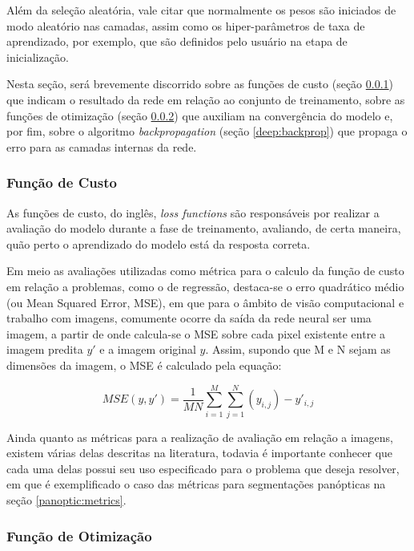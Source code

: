 Além da seleção aleatória, vale citar que normalmente os pesos são iniciados de modo aleatório nas camadas, assim como os hiper-parâmetros de taxa de aprendizado, por exemplo, que são definidos pelo usuário na etapa de inicialização.

Nesta seção, será brevemente discorrido sobre as funções de custo (seção \ref{deep:cust}) que indicam o resultado da rede em relação ao conjunto de treinamento, sobre as funções de otimização (seção \ref{deep:optimization}) que auxiliam na convergência do modelo e, por fim, sobre o algoritmo \textit{backpropagation} (seção \ref{deep:backprop}) que propaga o erro para as camadas internas da rede.


\subsubsection{Função de Custo}
\label{deep:cust}

As funções de custo, do inglês, \textit{loss functions} são responsáveis por realizar a avaliação do modelo durante a fase de treinamento, avaliando, de certa maneira, quão perto o aprendizado do modelo está da resposta correta.

Em meio as avaliações utilizadas como métrica para o calculo da função de custo em relação a problemas, como o de regressão, destaca-se o erro quadrático médio (ou Mean Squared Error, MSE)\cite{Wang2004ImageSimilarity}, em que para o âmbito de visão computacional e trabalho com imagens, comumente ocorre da saída da rede neural ser uma imagem, a partir de onde calcula-se o MSE sobre cada pixel existente entre a imagem predita $y'$ e a imagem original $y$. Assim, supondo que M e N sejam as dimensões da imagem, o MSE é calculado pela equação:

\begin{equation}
    \label{deep:eq:9}
    MSE(y,y') = \frac{1}{MN} \sum_{i=1}^{M} \sum_{j=1}^{N} (y_{i,j}) - y'_{i,j}
\end{equation}

Ainda quanto as métricas para a realização de avaliação em relação a imagens, existem várias delas descritas na literatura, todavia é importante conhecer que cada uma delas possui seu uso especificado para o problema que deseja resolver, em que é exemplificado o caso das métricas para segmentações panópticas na seção \ref{panoptic:metrics}.


\subsubsection{Função de Otimização}
\label{deep:optimization}

